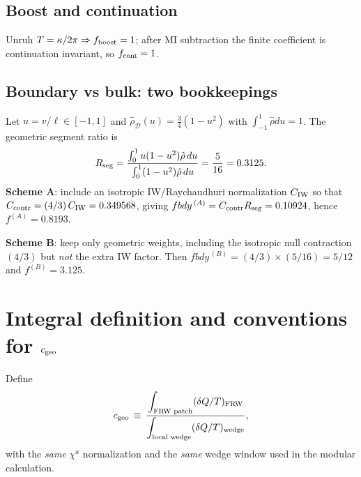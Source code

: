 \documentclass[aps,prd,onecolumn,superscriptaddress,nofootinbib]{revtex4-2}
\def\fbdy{fbdy}%
\newcommand{\fbdy}{f_{\rm bdy}}
\begin{document}
\subsection{Boost and continuation}
Unruh \(T=\kappa/2\pi\Rightarrow f_{\rm boost}=1\); after MI subtraction the finite coefficient is continuation invariant, so \(f_{\rm cont}=1\).

\subsection{Boundary vs bulk: two bookkeepings}
\label{app:fbdy-derivation}
Let \(u=v/\ell\in[-1,1]\) and \(\hat\rho_{\mathcal D}(u)=\tfrac{3}{4}(1-u^2)\) with \(\int_{-1}^1\hat\rho du=1\).
The geometric segment ratio is
\[
R_{\rm seg}=
\frac{\int_{0}^{1} u(1-u^2)\hat\rho\,du}{\int_{0}^{1} (1-u^2)\hat\rho\,du}
=\frac{5}{16}=0.3125.
\]
\textbf{Scheme A}: include an isotropic IW/Raychaudhuri normalization \(C_{\rm IW}\) so that \(C_{\rm contr}=({4}/{3})\,C_{\rm IW}=0.349568\), giving \(\fbdy^{\,(A)}=C_{\rm contr}R_{\rm seg}=0.10924\), hence \(f^{(A)}=0.8193\).

\textbf{Scheme B}: keep only geometric weights, including the isotropic null contraction \((4/3)\) but \emph{not} the extra IW factor. Then \(\fbdy^{\,(B)}=(4/3)\times (5/16)=5/12\) and \(f^{(B)}=3.125\).

\section{Integral definition and conventions for \texorpdfstring{$c_{\rm geo}$}{cgeo}}
\label{sec:cgeo-integral}
Define
\begin{equation}
 c_{\rm geo} \,\equiv\, \frac{\displaystyle \int_{\text{FRW patch}} (\delta Q/T)_{\text{FRW}}}{\displaystyle \int_{\text{local wedge}} (\delta Q/T)_{\text{wedge}}},
 \label{eq:cgeo-def}
\end{equation}
with the \emph{same} \(\chi^a\) normalization and the \emph{same} wedge window used in the modular calculation.
\end{document}

